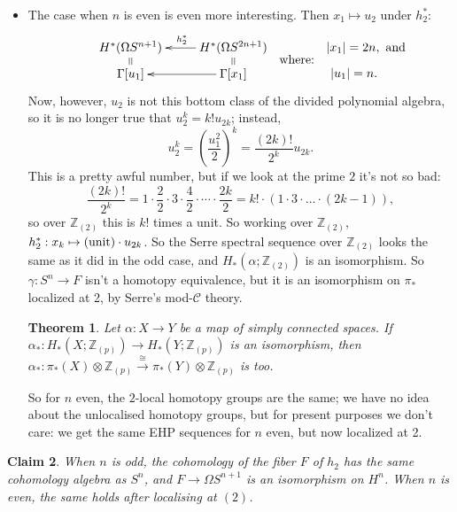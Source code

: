 \documentclass{article}
\newcommand{\Z}{\mathbb{Z}}
\newcommand{\Loops}{\Omega}
\newtheorem{thm}{Theorem}[section]
\newtheorem{claim}[thm]{Claim}
\begin{document}
\begin{itemize}
which \emph{are} homotopic by the Whitehead theorem; since $\tilde \gamma$ is equivariant with respect to deck transformations, $\gamma: F \to S^1$ is a homotopy equivalence (\textbf{I do not understand this}).  So now for n odd we have the homotopy fibration $S^n \to \Loops S^{n+1} \to \Loops S^{2n+1}$ whose long exact sequence is the EHP sequence
\[
\cdots \to \pi_i (S^n) \stackrel{e}{\to} \pi_{i+1} (S^{n+1}) \stackrel{h}{\to} \pi_{i+1} (S^{2n+1}) \stackrel{p}{\to} \pi_{i-1} (S^n) \stackrel{e}{\to} \pi_i (S^{n+1}) \to \cdots
\]
\item The case when $n$ is even is even more interesting. Then $x_1\mapsto u_2$ under $h_2^*$:
\[\xymatrix@R=.5em{
\ar@{=}[d]H^*(\Omega S^{n+1})&H^*(\Omega S^{2n+1})\ar[l]_{h_2^*}\ar@{=}[d]\\
\Gamma[u_1]&\Gamma[x_1]\ar[l]
}
\raisebox{-1em}{\ \ where:\ \ }
\xymatrix@R=.5em{
|x_1|=2n,\makebox[0cm][l]{ and }\\
|u_1|=n.
}
\]
Now, however, $u_2$ is not this bottom class of the divided polynomial algebra, so it is no longer true that $u_2^k = k! u_{2k}$; instead,
\[u_2^k=\left(\frac{u_1^2}{2}\right)^k=\frac{(2k)!}{2^k}u_{2k}.\]
This is a pretty awful number, but if we look at the prime $2$ it's not so bad:
\[
\frac{(2k)!}{2^k} = 1 \cdot \frac{2}{2} \cdot 3 \cdot \frac{4}{2} \cdot \cdots \cdot \frac{2k}{2} = k!\cdot(1\cdot3\cdot\ldots\cdot(2k-1))
,\]
so over $\Z_{(2)}$ this is $k!$ times a unit.  So working over $\Z_{(2)}$, $h_2^* : x_k \mapsto (\textup{unit})\cdot u_{2k}$.  So the Serre spectral sequence over $\Z_{(2)}$ looks the same as it did in the odd case, and $H_*(\alpha; \Z_{(2)})$ is an isomorphism.  So $\gamma: S^n \to F$ isn't a homotopy equivalence, but it is an isomorphism on $\pi_*$ localized at 2, by Serre's mod-$\mathscr{C}$ theory.
\begin{thm}
Let $\alpha: X \to Y$ be a map of simply connected spaces.  If $\alpha_*: H_*(X; \Z_{(p)}) \to H_*(Y; \Z_{(p)})$ is an isomorphism, then $\alpha_*: \pi_* (X) \otimes \Z_{(p)} \stackrel{\cong}{\to} \pi_* (Y) \otimes \Z_{(p)}$ is too.
\end{thm}
So for $n$ even, the $2$-local homotopy groups are the same; we have no idea about the unlocalised homotopy groups, but for present purposes we don't care: we get the same EHP sequences for $n$ even, but now localized at 2.
\end{itemize}
\begin{claim}\label{SerreSSEHPfiberArg}
When $n$ is odd, the cohomology of the fiber $F$ of $h_2$ has the same cohomology algebra as $S^n$, and $F\to \Omega S^{n+1}$ is an isomorphism on $H^n$. When $n$ is even, the same holds after localising at $(2)$.
\end{claim}
\end{document}

